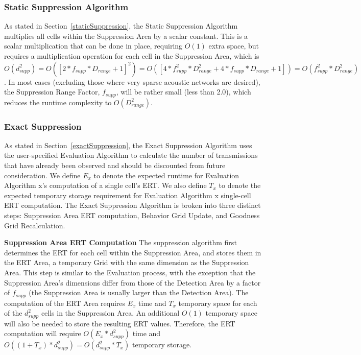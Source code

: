 \subsubsection{Static Suppression Algorithm}
As stated in Section~\ref{staticSuppression}, the Static Suppression Algorithm multiplies all cells within the Suppression Area by a scalar constant.  This is a scalar multiplication that can be done in place, requiring $O(1)$ extra space, but requires a multiplication operation for each cell in the Suppression Area, which is $O(d_{supp} ^2) = O([2*f_{supp}*D_{range} + 1]^2) = O([4*f_{supp}^2*D_{range}^2 + 4*f_{supp}*D_{range} + 1]) = O(f_{supp}^2*D_{range}^2)$.  In most cases (excluding those where very sparse acoustic networks are desired), the Suppression Range Factor, $f_{supp}$, will be rather small (less than 2.0), which reduces the runtime complexity to $O(D_{range}^2)$.

\subsubsection{Exact Suppression}
As stated in Section~\ref{exactSuppression}, the Exact Suppression Algorithm uses the user-specified Evaluation Algorithm to calculate the number of transmissions that have already been observed and should be discounted from future consideration.  We define $E_{x}$ to denote the expected runtime for Evaluation Algorithm x's computation of a single cell's ERT.  We also define $T_{x}$ to denote the expected temporary storage requirement for Evaluation Algorithm x single-cell ERT computation.  The Exact Suppression Algorithm is broken into three distinct steps: Suppression Area ERT computation, Behavior Grid Update, and Goodness Grid Recalculation.
\newline

\textbf{Suppression Area ERT Computation}\newline
The suppression algorithm first determines the ERT for each cell within the Suppression Area, and stores them in the ERT Area, a temporary Grid with the same dimension as the Suppression Area.  This step is similar to the Evaluation process, with the exception that the Suppression Area's dimensions differ from those of the Detection Area by a factor of $f_{supp}$ (the Suppression Area is usually larger than the Detection Area).  The computation of the ERT Area requires $E_{x}$ time and  $T_x$ temporary space for each of the $d_{supp}^2$ cells in the Suppression Area.  An additional  $O(1)$ temporary space will also be needed to store the resulting ERT values.  Therefore, the ERT computation will require $O(E_{x} * d_{supp}^2)$ time and $O((1 + T_x)* d_{supp}^2) = O(d_{supp}^2 * T_x)$ temporary storage.

